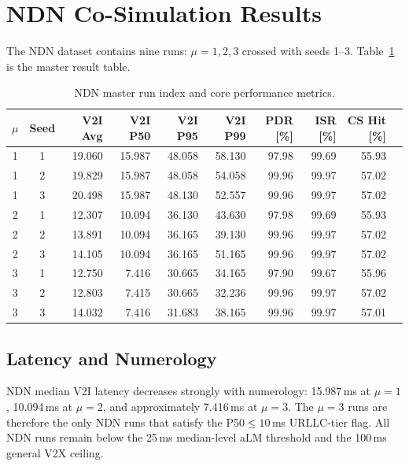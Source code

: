 \documentclass[journal]{IEEEtran}
\newcommand{\micro}{$\mu$}
\begin{document}
\section{NDN Co-Simulation Results}
\label{sec:ndn}

The NDN dataset contains nine runs: $\mu=1,2,3$ crossed with seeds 1--3. Table~\ref{tab:ndnindexv2} is the master result table.

\begin{table}[!t]\centering
\caption{NDN master run index and core performance metrics.}
\label{tab:ndnindexv2}
\footnotesize
\begin{tabular}{@{}ccrrrrrrrr@{}}
\toprule
\micro & Seed & V2I Avg & V2I P50 & V2I P95 & V2I P99 & PDR [\%] & ISR [\%] & CS Hit [\%]\\
\midrule
1 & 1 & 19.060 & 15.987 & 48.058 & 58.130 & 97.98 & 99.69 & 55.93\\
1 & 2 & 19.829 & 15.987 & 48.058 & 54.058 & 99.96 & 99.97 & 57.02\\
1 & 3 & 20.498 & 15.987 & 48.130 & 52.557 & 99.96 & 99.97 & 57.02\\
2 & 1 & 12.307 & 10.094 & 36.130 & 43.630 & 97.98 & 99.69 & 55.93\\
2 & 2 & 13.891 & 10.094 & 36.165 & 39.130 & 99.96 & 99.97 & 57.02\\
2 & 3 & 14.105 & 10.094 & 36.165 & 51.165 & 99.96 & 99.97 & 57.02\\
3 & 1 & 12.750 & 7.416 & 30.665 & 34.165 & 97.90 & 99.67 & 55.96\\
3 & 2 & 12.803 & 7.415 & 30.665 & 32.236 & 99.96 & 99.97 & 57.02\\
3 & 3 & 14.032 & 7.416 & 31.683 & 38.165 & 99.96 & 99.97 & 57.01\\
\bottomrule
\end{tabular}
\end{table}

\subsection{Latency and Numerology}

NDN median V2I latency decreases strongly with numerology: 15.987\,ms at $\mu=1$, 10.094\,ms at $\mu=2$, and approximately 7.416\,ms at $\mu=3$. The $\mu=3$ runs are therefore the only NDN runs that satisfy the P50$\le10$\,ms URLLC-tier flag. All NDN runs remain below the 25\,ms median-level aLM threshold and the 100\,ms general V2X ceiling.
\end{document}

